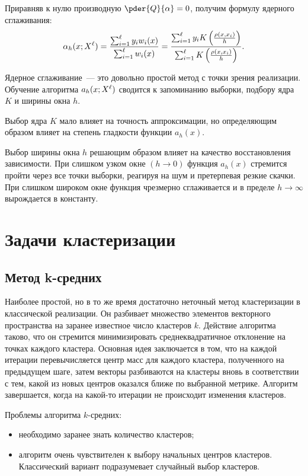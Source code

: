 Приравняв к нулю производную \( \ds\pder{Q}{\alpha} = 0 \), получим формулу ядерного сглаживания:
\begin{equation}
  \alpha_h(x; X^\ell) = \frac{\sum_{i=1}^\ell y_iw_i(x)}{\sum_{i=1}^\ell w_i(x)} =
  \frac{\sum_{i=1}^\ell y_iK\left(\frac{\rho(x, x_i)}{h}\right)}{\sum_{i=1}^\ell K\left(\frac{\rho(x, x_i)}{h}\right)}.
  \label{eq:5.4}
\end{equation}

Ядерное сглаживание~--- это довольно простой метод с точки зрения реализации. Обучение алгоритма
\( a_h(x; X^\ell) \) сводится к запоминанию выборки, подбору ядра \( K \) и ширины окна \( h \).

Выбор ядра \( K \) мало влияет на точность аппроксимации, но определяющим образом влияет на степень
гладкости функции \( a_h(x) \).

Выбор ширины окна \( h \) решающим образом влияет на качество восстановления зависимости. При слишком
узком окне \( (h\to 0) \) функция \( a_h(x) \) стремится пройти через все точки выборки, реагируя на шум
и претерпевая резкие скачки. При слишком широком окне функция чрезмерно сглаживается и в пределе
\( h\to\infty \) вырождается в константу.

\section{Задачи кластеризации}
\subsection{Метод k-средних}
Наиболее простой, но в то же время достаточно неточный метод кластеризации в классической реализации.
Он разбивает множество элементов векторного пространства на заранее известное число кластеров \( k \).
Действие алгоритма таково, что он стремится минимизировать среднеквадратичное отклонение на точках
каждого кластера. Основная идея заключается в том, что на каждой итерации перевычисляется центр масс
для каждого кластера, полученного на предыдущем шаге, затем векторы разбиваются на кластеры вновь в
соответствии с тем, какой из новых центров оказался ближе по выбранной метрике. Алгоритм завершается,
когда на какой-то итерации не происходит изменения кластеров.

Проблемы алгоритма \( k \)-средних:
\begin{itemize}
  \itemsep -5pt
  \item необходимо заранее знать количество кластеров;
  \item алгоритм очень чувствителен к выбору начальных центров кластеров. Классический вариант подразумевает случайный выбор кластеров.
\end{itemize}

